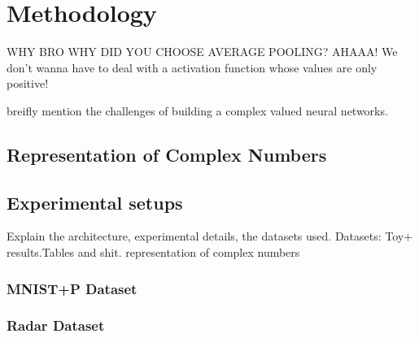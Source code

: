 \chapter{Methodology} \label{chap:methodology}
 
 WHY BRO WHY DID YOU CHOOSE AVERAGE POOLING?
 AHAAA!  We don't wanna have to deal with a activation function whose values are only positive!
 
 breifly mention the challenges of building a complex valued neural networks. 
 
 \section{Representation of Complex Numbers}
 \section{Experimental setups}
 Explain the architecture, experimental details, the datasets used. Datasets: Toy+ results.Tables and shit.
 representation of complex numbers
 
 \textbf{}
 \subsection{MNIST+P Dataset}
 
 \subsection{Radar Dataset}
 
 
 
 
 
 